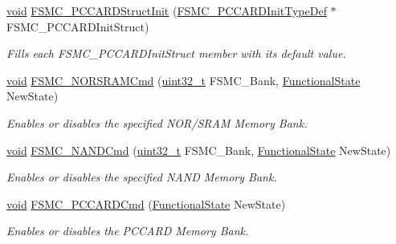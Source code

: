 \begin{DoxyCompactItemize}
\hyperlink{usb__devapi_8h_afabf60e7f57651d6d595a02c75f07cd0}{void} \hyperlink{group___f_s_m_c___exported___functions_ga7a64ba0e0545b3f1913c9d1d28c05e62}{F\+S\+M\+C\+\_\+\+P\+C\+C\+A\+R\+D\+Struct\+Init} (\hyperlink{struct_f_s_m_c___p_c_c_a_r_d_init_type_def}{F\+S\+M\+C\+\_\+\+P\+C\+C\+A\+R\+D\+Init\+Type\+Def} $\ast$F\+S\+M\+C\+\_\+\+P\+C\+C\+A\+R\+D\+Init\+Struct)
\begin{DoxyCompactList}\small\item\em Fills each F\+S\+M\+C\+\_\+\+P\+C\+C\+A\+R\+D\+Init\+Struct member with its default value. \end{DoxyCompactList}\item 
\hyperlink{usb__devapi_8h_afabf60e7f57651d6d595a02c75f07cd0}{void} \hyperlink{group___f_s_m_c___exported___functions_gaf943f0f2680168d3a95a3c2c9f3eca2a}{F\+S\+M\+C\+\_\+\+N\+O\+R\+S\+R\+A\+M\+Cmd} (\hyperlink{_p_e___types_8h_a33594304e786b158f3fb30289278f5af}{uint32\+\_\+t} F\+S\+M\+C\+\_\+\+Bank, \hyperlink{agilefox_2library_2inc_2stm32f10x__type_8h_ac9a7e9a35d2513ec15c3b537aaa4fba1}{Functional\+State} New\+State)
\begin{DoxyCompactList}\small\item\em Enables or disables the specified N\+O\+R/\+S\+R\+AM Memory Bank. \end{DoxyCompactList}\item 
\hyperlink{usb__devapi_8h_afabf60e7f57651d6d595a02c75f07cd0}{void} \hyperlink{group___f_s_m_c___exported___functions_ga33ec7c39ea4d42e92c72c6e517d8235c}{F\+S\+M\+C\+\_\+\+N\+A\+N\+D\+Cmd} (\hyperlink{_p_e___types_8h_a33594304e786b158f3fb30289278f5af}{uint32\+\_\+t} F\+S\+M\+C\+\_\+\+Bank, \hyperlink{agilefox_2library_2inc_2stm32f10x__type_8h_ac9a7e9a35d2513ec15c3b537aaa4fba1}{Functional\+State} New\+State)
\begin{DoxyCompactList}\small\item\em Enables or disables the specified N\+A\+ND Memory Bank. \end{DoxyCompactList}\item 
\hyperlink{usb__devapi_8h_afabf60e7f57651d6d595a02c75f07cd0}{void} \hyperlink{group___f_s_m_c___exported___functions_ga2d410151ceb3428c6a1bf374a0472cde}{F\+S\+M\+C\+\_\+\+P\+C\+C\+A\+R\+D\+Cmd} (\hyperlink{agilefox_2library_2inc_2stm32f10x__type_8h_ac9a7e9a35d2513ec15c3b537aaa4fba1}{Functional\+State} New\+State)
\begin{DoxyCompactList}\small\item\em Enables or disables the P\+C\+C\+A\+RD Memory Bank. \end{DoxyCompactList}\item 

\end{DoxyCompactItemize}
